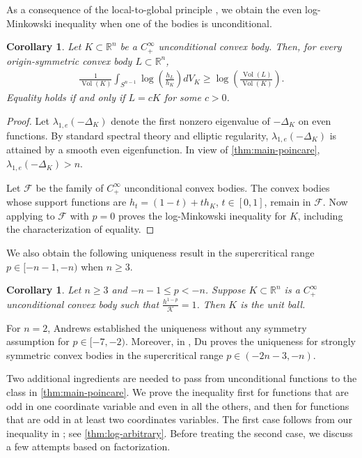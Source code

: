 \documentclass[12pt]{amsart}
\newcommand{\R}{\mathbb{R}}
\newcommand{\Sn}{S^{n-1}}
\newcommand{\eq}[1]{\begin{equation}\begin{alignedat}{2}#1\end{alignedat}\end{equation}}
\theoremstyle{plain}
\newtheorem{corollary}[theorem]{Corollary}
\theoremstyle{definition}
\theoremstyle{remark}
\numberwithin{equation}{section}
\begin{document}
As a consequence of the local-to-global principle \cite{BCD17,CHLL20,Put21,Mil25}, we obtain the even log-Minkowski inequality when one of the bodies is unconditional.

\begin{corollary}\label{cor:unconditional-log-minkowski}
Let $K\subset\R^n$ be a $C^{\infty}_+$ unconditional convex body.
Then, for every origin-symmetric convex body $L\subset\R^n$,
\eq{
 \frac{1}{\operatorname{Vol}(K)}
 \int_{\Sn}\log\left(\frac{h_L}{h_K}\right)dV_K
 \geq
\log\left(
 \frac{\operatorname{Vol}(L)}{\operatorname{Vol}(K)}
 \right).
}
Equality holds if and only if $L=cK$ for some $c>0$.
\end{corollary}

\begin{proof}
Let $\lambda_{1,e}(-\Delta_K)$ denote the first nonzero eigenvalue of $-\Delta_K$ on even functions. By standard spectral theory and elliptic regularity, $\lambda_{1,e}(-\Delta_K)$ is attained by a smooth even eigenfunction. In view of \autoref{thm:main-poincare}, $\lambda_{1,e}(-\Delta_K)>n$.

Let $\mathcal{F}$ be the family of $C^{\infty}_+$ unconditional convex bodies. The convex bodies whose support functions are $ h_t=(1-t)+th_K$, $t\in[0,1]$, remain in $\mathcal{F}$. Now applying \cite[Thm. 2.6]{IM23a} to $\mathcal{F}$ with $p=0$ proves the log-Minkowski inequality for $K$, including the characterization of equality.
\end{proof}



We also obtain the following uniqueness result in the supercritical range $p\in [-n-1,-n)$ when $n\ge 3$.

\begin{corollary}\label{cor:uniqueness}
Let $n\ge 3$ and $-n-1\leq p<-n$. Suppose $K\subset\R^n$ is a $C^{\infty}_+$ unconditional convex body such that $\frac{h^{1-p}}{\mathcal{K}}=1$. Then $K$ is the unit ball.
\end{corollary}
For $n=2$, Andrews \cite{And03} established the uniqueness without any symmetry assumption for $p\in[-7,-2)$. Moreover, in \cite{Du25}, Du proves the uniqueness for strongly symmetric convex bodies in the supercritical range $p\in(-2n-3,-n)$.


Two additional ingredients are needed to pass from unconditional functions to the class in \autoref{thm:main-poincare}. We prove the inequality first for functions that are odd in one coordinate variable and even in all the others, and then for functions that are odd in at least two coordinates variables. The first case follows from our inequality in \cite{HI26}; see \autoref{thm:log-arbitrary}. Before treating the second case, we discuss a few attempts based on factorization.
\end{document}

